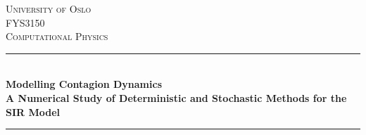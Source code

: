 	\begin{titlepage} %
		\newcommand{\HRule}{\rule{\linewidth}{0.5mm}} %
		
		\center %
		
		
		\textsc{\LARGE University of Oslo}\\[1.5cm] %
		
		\textsc{\Large FYS3150}\\[0.5cm] %
		
		\textsc{\large Computational Physics}\\[0.5cm] %
		
		
		\HRule\\[0.4cm]
		
		{\huge\bfseries Modelling Contagion Dynamics\\
		\Large{A Numerical Study of Deterministic and Stochastic Methods for the SIR Model}\\[0.4cm] %
		}
		\HRule\\[1.5cm]
		
		
		

\end{titlepage}

